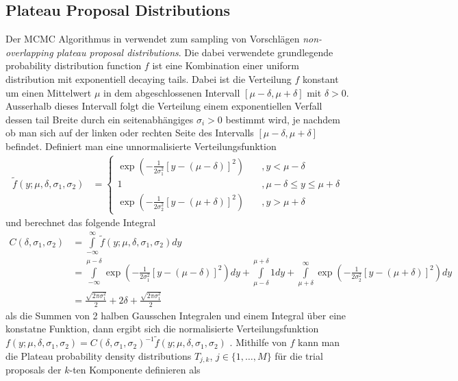 \documentclass{scrartcl}
\begin{document}
	\subsection{Plateau Proposal Distributions}
    Der MCMC Algorithmus in \cite{lau2019} verwendet zum sampling von Vorschlägen \textit{non-overlapping plateau proposal distributions}.
	Die dabei verwendete grundlegende probability distribution function $f$ ist eine Kombination einer uniform distribution
	mit exponentiell decaying tails. Dabei ist die Verteilung $f$ konstant um einen Mittelwert $\mu$ in dem abgeschlossenen Intervall $[\mu-\delta,\mu+\delta]$ mit $\delta > 0$.
	Ausserhalb dieses Intervall folgt die Verteilung einem exponentiellen Verfall dessen tail Breite durch ein seitenabhängiges $\sigma_i >0$ bestimmt wird,
	je nachdem ob man sich auf der linken oder rechten Seite des Intervalls $[\mu-\delta,\mu+\delta]$ befindet. Definiert man
	eine unnormalisierte Verteilungsfunktion
	\begin{align*}
		\tilde{f}(y;\mu,\delta,\sigma_1,\sigma_2)&=\begin{cases}
			\exp\left( -\frac{1}{2\sigma_1^2}[y-(\mu-\delta)]^2 \right)&\quad ,y<\mu-\delta\\
           1&\quad ,\mu-\delta\leq y\leq\mu+\delta\\
           \exp\left( -\frac{1}{2\sigma_2^2}[y-(\mu+\delta)]^2 \right)&\quad ,y>\mu+\delta
		\end{cases}
	\end{align*}
    und berechnet das folgende Integral
    \begin{align*}
        C(\delta,\sigma_1,\sigma_2)&=\int\limits_{-\infty}^\infty\tilde{f}(y;\mu,\delta,\sigma_1,\sigma_2) dy\\
        &= \int\limits_{-\infty}^{\mu-\delta}\exp\left( -\frac{1}{2\sigma_1^2}[y-(\mu-\delta)]^2 \right)dy+
        \int\limits_{\mu-\delta}^{\mu+\delta}1dy+
        \int\limits_{\mu+\delta}^{\infty}\exp\left( -\frac{1}{2\sigma_2^2}[y-(\mu+\delta)]^2 \right)dy\\
        &=\frac{\sqrt{2\pi\sigma_1^2}}{2}+2\delta+\frac{\sqrt{2\pi\sigma_1^2}}{2}
    \end{align*}
    als die Summen von 2 halben Gausschen Integralen und einem Integral über eine konstatne Funktion, dann ergibt sich die normalisierte Verteilungsfunktion $f(y;\mu,\delta,\sigma_1,\sigma_2)=C(\delta,\sigma_1,\sigma_2)^{-1}\tilde{f}(y;\mu,\delta,\sigma_1,\sigma_2)$ \cite{lau2019}.
    Mithilfe von $f$ kann man die Plateau probability density distributions $T_{j,k}$, $j\in\{1,\dots,M\}$ für die trial proposals der $k$-ten Komponente definieren als
\end{document}
